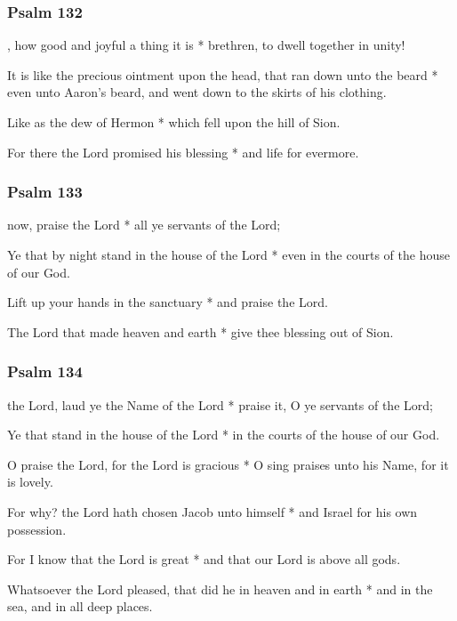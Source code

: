 \subsubsection{Psalm 132}


, how good and joyful a thing it is * brethren, to dwell together in unity!

It is like the precious ointment upon the head, that ran down unto the beard * even unto Aaron's beard, and went down to the skirts of his clothing.

Like as the dew of Hermon * which fell upon the hill of Sion.

For there the Lord promised his blessing * and life for evermore.

\subsubsection{Psalm 133}


 now, praise the Lord * all ye servants of the Lord;

Ye that by night stand in the house of the Lord * even in the courts of the house of our God.

Lift up your hands in the sanctuary * and praise the Lord.

The Lord that made heaven and earth * give thee blessing out of Sion.



\subsubsection{Psalm 134}


 the Lord, laud ye the Name of the Lord * praise it, O ye servants of the Lord;

Ye that stand in the house of the Lord * in the courts of the house of our God.

O praise the Lord, for the Lord is gracious * O sing praises unto his Name, for it is lovely.

For why? the Lord hath chosen Jacob unto himself * and Israel for his own possession.

For I know that the Lord is great * and that our Lord is above all gods.

Whatsoever the Lord pleased, that did he in heaven and in earth * and in the sea, and in all deep places.

